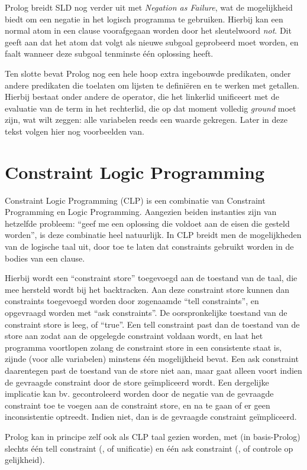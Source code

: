 Prolog breidt SLD nog verder uit met {\em Negation as Failure}, wat de mogelijkheid biedt om een negatie in het logisch programma te gebruiken. Hierbij kan een normal atom in een clause voorafgegaan worden door het sleutelwoord {\em not}. Dit geeft aan dat het atom dat volgt als nieuwe subgoal geprobeerd moet worden, en faalt wanneer deze subgoal tenminste \'e\'en oplossing heeft.

Ten slotte bevat Prolog nog een hele hoop extra ingebouwde predikaten, onder andere predikaten die toelaten om lijsten te defini\"eren en te werken met getallen. Hierbij bestaat onder andere de  operator, die het linkerlid unificeert met de evaluatie van de term in het rechterlid, die op dat moment volledig {\em ground} moet zijn, wat wilt zeggen: alle variabelen reeds een waarde gekregen. Later in deze tekst volgen hier nog voorbeelden van.

\section{Constraint Logic Programming}

Constraint Logic Programming (CLP) is een combinatie van Constraint Programming en Logic Programming. Aangezien beiden instanties zijn van hetzelfde probleem: ``geef me een oplossing die voldoet aan de eisen die gesteld worden'', is deze combinatie heel natuurlijk. In CLP breidt men de mogelijkheden van de logische taal uit, door toe te laten dat constraints gebruikt worden in de bodies van een clause. 

Hierbij wordt een ``constraint store'' toegevoegd aan de toestand van de taal, die mee hersteld wordt bij het backtracken. Aan deze constraint store kunnen dan constraints toegevoegd worden door zogenaamde ``tell constraints'', en opgevraagd worden met ``ask constraints''. De oorspronkelijke toestand van de constraint store is leeg, of ``true''. Een tell constraint past dan de toestand van de store aan zodat aan de opgelegde constraint voldaan wordt, en laat het programma voortlopen zolang de constraint store in een consistente staat is, zijnde (voor alle variabelen) minstens \'e\'en mogelijkheid bevat. Een ask constraint daarentegen past de toestand van de store niet aan, maar gaat alleen voort indien de gevraagde constraint door de store ge\"impliceerd wordt. Een dergelijke implicatie kan bv. gecontroleerd worden door de negatie van de gevraagde constraint toe te voegen aan de constraint store, en na te gaan of er geen inconsistentie optreedt. Indien niet, dan is de gevraagde constraint ge\"impliceerd.

Prolog kan in principe zelf ook als CLP taal gezien worden, met (in basis-Prolog) slechts \'e\'en tell constraint (\code{=}, of unificatie) en \'e\'en ask constraint (\code{==}, of controle op gelijkheid).

